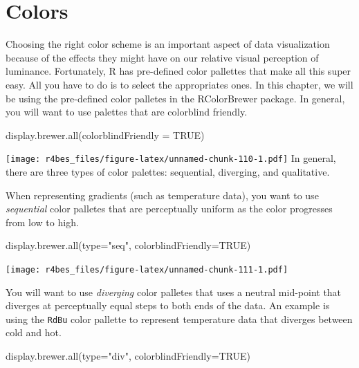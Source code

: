 \documentclass[
]{book}
\newenvironment{Shaded}{\begin{snugshade}}{\end{snugshade}}
\newcommand{\AttributeTok}[1]{\textcolor[rgb]{0.77,0.63,0.00}{#1}}
\newcommand{\ConstantTok}[1]{\textcolor[rgb]{0.00,0.00,0.00}{#1}}
\newcommand{\FunctionTok}[1]{\textcolor[rgb]{0.00,0.00,0.00}{#1}}
\newcommand{\NormalTok}[1]{#1}
\newcommand{\StringTok}[1]{\textcolor[rgb]{0.31,0.60,0.02}{#1}}
\begin{document}
\hypertarget{colors}{%
\section{Colors}\label{colors}}

Choosing the right color scheme is an important aspect of data visualization because of the effects they might have on our relative visual perception of luminance. Fortunately, R has pre-defined color pallettes that make all this super easy. All you have to do is to select the appropriates ones. In this chapter, we will be using the pre-defined color palletes in the RColorBrewer package. In general, you will want to use palettes that are colorblind friendly.

\begin{Shaded}
\begin{Highlighting}[]
\FunctionTok{display.brewer.all}\NormalTok{(}\AttributeTok{colorblindFriendly =} \ConstantTok{TRUE}\NormalTok{)}
\end{Highlighting}
\end{Shaded}

\texttt{[image: r4bes\_files/figure-latex/unnamed-chunk-110-1.pdf]}
In general, there are three types of color palettes: sequential, diverging, and qualitative.

When representing gradients (such as temperature data), you want to use \emph{sequential} color palletes that are perceptually uniform as the color progresses from low to high.

\begin{Shaded}
\begin{Highlighting}[]
\FunctionTok{display.brewer.all}\NormalTok{(}\AttributeTok{type=}\StringTok{"seq"}\NormalTok{, }\AttributeTok{colorblindFriendly=}\ConstantTok{TRUE}\NormalTok{)}
\end{Highlighting}
\end{Shaded}

\texttt{[image: r4bes\_files/figure-latex/unnamed-chunk-111-1.pdf]}

You will want to use \emph{diverging} color palletes that uses a neutral mid-point that diverges at perceptually equal steps to both ends of the data. An example is using the \texttt{RdBu} color pallette to represent temperature data that diverges between cold and hot.

\begin{Shaded}
\begin{Highlighting}[]
\FunctionTok{display.brewer.all}\NormalTok{(}\AttributeTok{type=}\StringTok{"div"}\NormalTok{, }\AttributeTok{colorblindFriendly=}\ConstantTok{TRUE}\NormalTok{)}
\end{Highlighting}
\end{Shaded}
\end{document}
